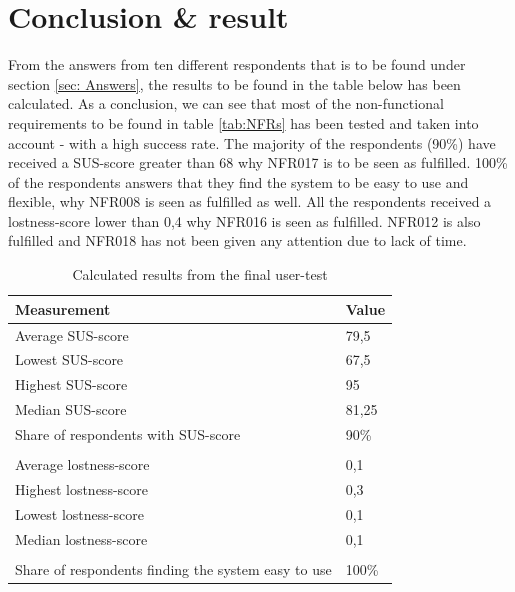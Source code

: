 \documentclass[12pt]{article}
\begin{document}
    \section{Conclusion \& result}
    \label{sec: Conclusion}
    From the answers from ten different respondents that is to be found under section \ref{sec: Answers}, the results to be found in the table below has been calculated. As a conclusion, we can see that most of the non-functional requirements to be found in table \ref{tab:NFRs} has been tested and taken into account - with a high success rate. The majority of the respondents (90\%) have received a SUS-score greater than 68 why NFR017 is to be seen as fulfilled. 100\% of the respondents answers that they find the system to be easy to use and flexible, why NFR008 is seen as fulfilled as well. All the respondents received a lostness-score lower than 0,4 why NFR016 is seen as fulfilled. NFR012 is also fulfilled and NFR018 has not been given any attention due to lack of time. 
    \begin{table}[H]

    \begin{center}
    \begin{tabular}{ | m{12cm} |m{3cm}|}  
    \hline
    \textbf{Measurement} & \textbf{Value} \\
    \hline
    Average SUS-score & 79,5 \\
    \hline
    Lowest SUS-score & 67,5\\
    \hline
	Highest SUS-score & 95 \\
    \hline				
    Median SUS-score & 81,25 \\
    \hline				
    Share of respondents with SUS-score \geq 68 & 90\% \\
    \hline
     & \\
    \hline
    Average lostness-score & 0,1\\
    \hline			
    Highest lostness-score & 0,3\\
    \hline				
    Lowest lostness-score & 0,1\\
    \hline				
    Median lostness-score & 0,1\\
    \hline
    & \\
    \hline
    Share of respondents finding the system easy to use & 100\%\\
    \hline				
    \end{tabular}
    \end{center}
    \caption{\label{tab:Reults}Calculated results from the final user-test}
    \end{table}
    
\end{document}
